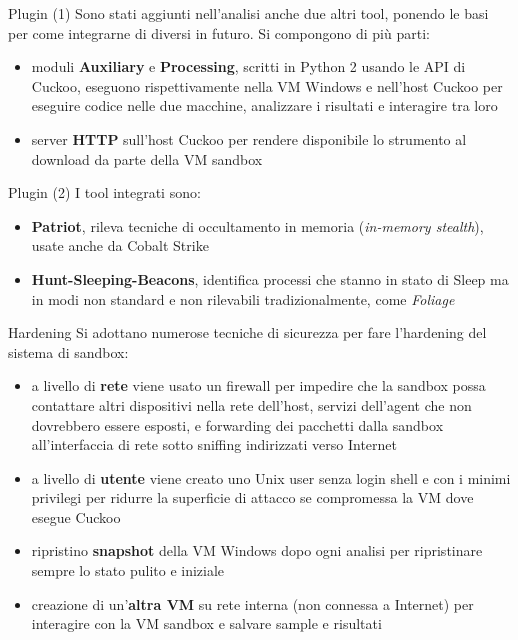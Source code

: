 \begin{frame}{Plugin (1)}
Sono stati aggiunti nell'analisi anche due altri tool, ponendo le basi per come integrarne di diversi in futuro. Si compongono di più parti:
\begin{itemize}
    \item moduli \textbf{Auxiliary} e \textbf{Processing}, scritti in Python 2 usando le API di Cuckoo, eseguono rispettivamente nella VM Windows e nell'host Cuckoo per eseguire codice nelle due macchine, analizzare i risultati e interagire tra loro
    \item server \textbf{HTTP} sull'host Cuckoo per rendere disponibile lo strumento al download da parte della VM sandbox
\end{itemize}
\end{frame}

\begin{frame}{Plugin (2)}
I tool integrati sono:
\begin{itemize}
    \item \textbf{Patriot}, rileva tecniche di occultamento in memoria (\emph{in-memory stealth}), usate anche da Cobalt Strike
    \item \textbf{Hunt-Sleeping-Beacons}, identifica processi che stanno in stato di Sleep ma in modi non standard e non rilevabili tradizionalmente, come \emph{Foliage}
\end{itemize}
\end{frame}


\begin{frame}{Hardening}
Si adottano numerose tecniche di sicurezza per fare l'hardening del sistema di sandbox:
\begin{itemize}
    \item a livello di \textbf{rete} viene usato un firewall per impedire che la sandbox possa contattare altri dispositivi nella rete dell'host, servizi dell'agent che non dovrebbero essere esposti, e forwarding dei pacchetti dalla sandbox all'interfaccia di rete sotto sniffing indirizzati verso Internet
    \item a livello di \textbf{utente} viene creato uno Unix user senza login shell e con i minimi privilegi per ridurre la superficie di attacco se compromessa la VM dove esegue Cuckoo
    \item ripristino \textbf{snapshot} della VM Windows dopo ogni analisi per ripristinare sempre lo stato pulito e iniziale
    \item creazione di un'\textbf{altra VM} su rete interna (non connessa a Internet) per interagire con la VM sandbox e salvare sample e risultati
\end{itemize}
\end{frame}

